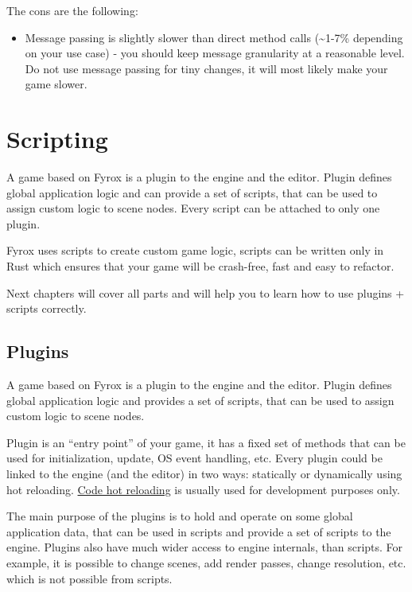 \documentclass[
]{book}
\providecommand{\tightlist}{%
  \setlength{\itemsep}{0pt}\setlength{\parskip}{0pt}}
\theoremstyle{definition}
\theoremstyle{definition}
\theoremstyle{definition}
\theoremstyle{definition}
\theoremstyle{remark}
\begin{document}
The cons are the following:

\begin{itemize}
\tightlist
\item
  Message passing is slightly slower than direct method calls (\textasciitilde1-7\% depending on your use case) - you should keep message granularity at a reasonable level. Do not use message passing for tiny changes, it will most likely make your game slower.
\end{itemize}

\chapter{Scripting}\label{scripting}

A game based on Fyrox is a plugin to the engine and the editor. Plugin defines global application logic and can provide
a set of scripts, that can be used to assign custom logic to scene nodes. Every script can be attached to only one
plugin.

Fyrox uses scripts to create custom game logic, scripts can be written only in Rust which ensures that your game will
be crash-free, fast and easy to refactor.

Next chapters will cover all parts and will help you to learn how to use plugins + scripts correctly.

\section{Plugins}\label{plugins-1}

A game based on Fyrox is a plugin to the engine and the editor. Plugin defines global application logic and provides
a set of scripts, that can be used to assign custom logic to scene nodes.

Plugin is an ``entry point'' of your game, it has a fixed set of methods that can be used for initialization, update,
OS event handling, etc. Every plugin could be linked to the engine (and the editor) in two ways: statically or dynamically
using hot reloading. \href{../beginning/hot_reloading.md}{Code hot reloading} is usually used for development purposes only.

The main purpose of the plugins is to hold and operate on some global application data, that can be used in scripts and
provide a set of scripts to the engine. Plugins also have much wider access to engine internals, than scripts. For example,
it is possible to change scenes, add render passes, change resolution, etc. which is not possible from scripts.
\end{document}
